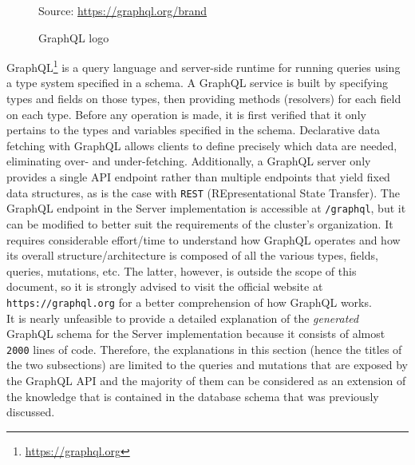 \begin{figure} %
  \centering
  \def\stackalignment{r} %
  {\scriptsize \parbox[t]{\linewidth}{ Source: \url{https://graphql.org/brand}} }
  \caption{GraphQL logo}
\end{figure}

GraphQL\footnote{\url{https://graphql.org}} is a query language and server-side
runtime for running queries using a type system specified in a schema. A GraphQL
service is built by specifying types and fields on those types, then providing
methods (resolvers) for each field on each type. Before any operation is made,
it is first verified that it only pertains to the types and variables specified
in the schema. Declarative data fetching with GraphQL allows clients to define precisely
which data are needed, eliminating over- and under-fetching. Additionally, a GraphQL
server only provides a single API endpoint rather than multiple endpoints that yield
fixed data structures, as is the case with \texttt{REST} (REpresentational State
Transfer). The GraphQL endpoint in the Server implementation is accessible at
\texttt{/graphql}, but it can be modified to better suit the requirements of the
cluster's organization. It requires considerable effort/time to understand how
GraphQL operates and how its overall structure/architecture is composed of all
the various types, fields, queries, mutations, etc. The latter, however, is outside
the scope of this document, so it is strongly advised to visit the official
website at \texttt{https://graphql.org} for a better comprehension of how GraphQL
works. \\ %
It is nearly unfeasible to provide a detailed explanation of the \textit{generated}
GraphQL schema for the Server implementation because it consists of almost
\texttt{2000} lines of code. Therefore, the explanations in this section (hence
the titles of the two subsections) are limited to the queries and mutations that
are exposed by the GraphQL API and the majority of them can be considered as an extension
of the knowledge that is contained in the database schema that was previously discussed.
